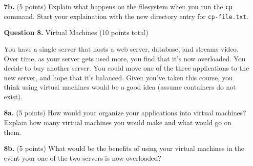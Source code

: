 \documentclass[12pt]{article}
\begin{document}
\vspace{16em}

\textbf{7b.} (5 points)
Explain what happens on the filesystem when you run the \texttt{cp} command.
Start your explaination with the new directory entry for \texttt{cp-file.txt}.

\newpage

\textbf{Question 8.} Virtual Machines (10 points total)

\vspace{1em}

You have a single server that hosts a web server, database, and streams video.
Over time, as your server gets used more, you find that it's now overloaded.
You decide to buy another server.
You could move one of the three applications to the new server, and hope that
it's balanced.
Given you've taken this course, you think using virtual machines would be a good
idea (assume containers do not exist).

\vspace{1em}

\textbf{8a.} (5 points)
How would your organize your applications into virtual machines?
Explain how many virtual machines you would make and what would go on them.

\vspace{21em}

\textbf{8b.} (5 points)
What would be the benefits of using your virtual machines in the event your
one of the two servers is now overloaded?

\afterpage{\null\newpage}
\end{document}
